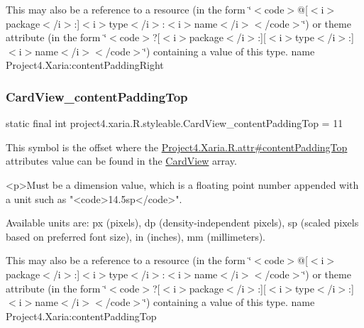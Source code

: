 This may also be a reference to a resource (in the form \char`\"{}$<$code$>$@\mbox{[}$<$i$>$package$<$/i$>$\+:\mbox{]}$<$i$>$type$<$/i$>$\+:$<$i$>$name$<$/i$>$$<$/code$>$\char`\"{}) or theme attribute (in the form \char`\"{}$<$code$>$?\mbox{[}$<$i$>$package$<$/i$>$\+:\mbox{]}\mbox{[}$<$i$>$type$<$/i$>$\+:\mbox{]}$<$i$>$name$<$/i$>$$<$/code$>$\char`\"{}) containing a value of this type.  name Project4.\+Xaria\+:content\+Padding\+Right \mbox{\label{classproject4_1_1xaria_1_1R_1_1styleable_a3b92595b1e8cae542bff3b32ab58c2b1}} 
\subsubsection{\texorpdfstring{Card\+View\+\_\+content\+Padding\+Top}{CardView\_contentPaddingTop}}
{\footnotesize\ttfamily static final int project4.\+xaria.\+R.\+styleable.\+Card\+View\+\_\+content\+Padding\+Top = 11\hspace{0.3cm}{\ttfamily [static]}}

This symbol is the offset where the \hyperlink{}{Project4.\+Xaria.\+R.\+attr\#content\+Padding\+Top} attribute\textquotesingle{}s value can be found in the \hyperlink{classproject4_1_1xaria_1_1R_1_1styleable_abef2e3d3e2b11dd786470094dbc57ea4}{Card\+View} array.

\begin{DoxyVerb}      <p>Must be a dimension value, which is a floating point number appended with a unit such as "<code>14.5sp</code>".
\end{DoxyVerb}
 Available units are\+: px (pixels), dp (density-\/independent pixels), sp (scaled pixels based on preferred font size), in (inches), mm (millimeters). 

This may also be a reference to a resource (in the form \char`\"{}$<$code$>$@\mbox{[}$<$i$>$package$<$/i$>$\+:\mbox{]}$<$i$>$type$<$/i$>$\+:$<$i$>$name$<$/i$>$$<$/code$>$\char`\"{}) or theme attribute (in the form \char`\"{}$<$code$>$?\mbox{[}$<$i$>$package$<$/i$>$\+:\mbox{]}\mbox{[}$<$i$>$type$<$/i$>$\+:\mbox{]}$<$i$>$name$<$/i$>$$<$/code$>$\char`\"{}) containing a value of this type.  name Project4.\+Xaria\+:content\+Padding\+Top \mbox{\label{classproject4_1_1xaria_1_1R_1_1styleable_a22d4439a4550b11fcac1b86a5aaca608}} 

